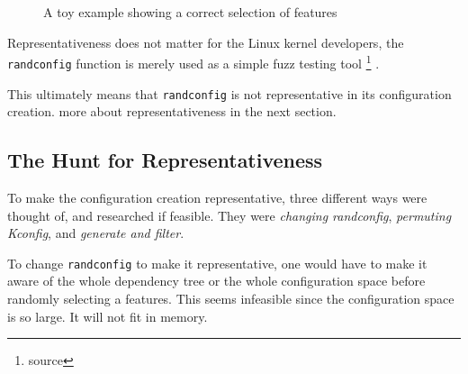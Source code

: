 \documentclass[a4paper,11pt]{report}
\newcommand{\textcode}[1]{
    \fboxsep=1pt
    \texttt{\colorbox{gray!20}{#1}}
}
\newcommand{\figa}{
    \begin{figure}[!htpb]
    \centering
}
\newcommand{\figb}[2]{
    \caption{#1}
    \label{#2}
    \end{figure}
}
\begin{document}
\figa
\figb{A toy example showing a correct selection of features}{randconfigtoy33}

Representativeness does not matter for the Linux kernel developers, the 
\texttt{randconfig} function is merely used as a simple fuzz testing tool
    \footnote{source}
.

This ultimately means that \texttt{randconfig} is not representative in its 
configuration creation. more about representativeness in the next section.

    \subsection{The Hunt for Representativeness}
To make the configuration creation representative, three different ways were
thought of, and researched if feasible. They were \emph{changing randconfig}, 
\emph{permuting Kconfig}, and \emph{generate and filter}.

To change \texttt{randconfig} to make it representative, one would have to make 
it aware of the whole dependency tree or the whole configuration space before 
randomly selecting a features. This seems infeasible since the configuration 
space is so large. It will not fit in memory.
\\
\end{document}
